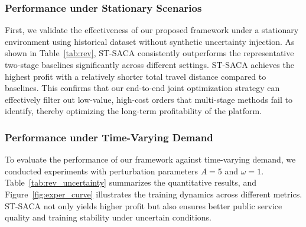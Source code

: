 \documentclass[lettersize,journal]{IEEEtran}
\begin{document}
\color{blue}
\subsubsection{Performance under Stationary Scenarios}
First, we validate the effectiveness of our proposed framework under a stationary environment using historical dataset without synthetic uncertainty injection. As shown in Table~\ref{tab:rev}, ST-SACA consistently outperforms the representative two-stage baselines significantly across different settings. ST-SACA achieves the highest profit with a relatively shorter total travel distance compared to baselines. This confirms that our end-to-end joint optimization strategy can effectively filter out low-value, high-cost orders that multi-stage methods fail to identify, thereby optimizing the long-term profitability of the platform.

\begin{table}[htbp]
\caption{\textcolor{blue}{Performance Comparison under Stationary Scenario}}
\label{tab:rev}
\begin{center}
\color{blue}
\end{center}
\end{table}

\color{blue}

\subsubsection{Performance under Time-Varying Demand}
To evaluate the performance of our framework against time-varying demand, we conducted experiments with perturbation parameters $A=5$ and $\omega=1$. Table~\ref{tab:rev_uncertainty} summarizes the quantitative results, and Figure~\ref{fig:exper_curve} illustrates the training dynamics across different metrics. ST-SACA not only yields higher profit but also ensures better public service quality and training stability under uncertain conditions.
\end{document}
